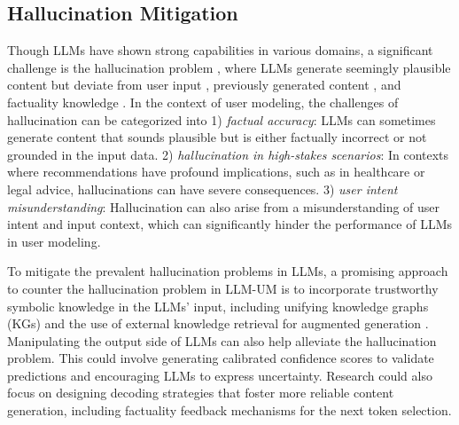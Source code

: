 \documentclass[11pt]{article}
\begin{document}
\subsection{Hallucination Mitigation}
Though LLMs have shown strong capabilities in various domains, a significant challenge is the hallucination problem \cite{zhang2023siren, ji2023survey}, where LLMs generate seemingly plausible content but deviate from user input \cite{adlakha2023evaluating}, previously generated content \cite{liu2021token}, and factuality knowledge \cite{min2023factscore, feng2023factkb}. In the context of user modeling, the challenges of hallucination can be categorized into 1) \textit{factual accuracy}: LLMs can sometimes generate content that sounds plausible but is either factually incorrect or not grounded in the input data. 2) \textit{hallucination in high-stakes scenarios}: In contexts where recommendations have profound implications, such as in healthcare or legal advice, hallucinations can have severe consequences. 3) \textit{user intent misunderstanding}: Hallucination can also arise from a misunderstanding of user intent and input context, which can significantly hinder the performance of LLMs in user modeling.



To mitigate the prevalent hallucination problems in LLMs, a promising approach to counter the hallucination problem in LLM-UM is to incorporate trustworthy symbolic knowledge in the LLMs' input, including unifying knowledge graphs (KGs) \cite{pan2023unifying} and the use of external knowledge retrieval for augmented generation \cite{yu2022survey}. Manipulating the output side of LLMs can also help alleviate the hallucination problem. This could involve generating calibrated confidence scores to validate predictions and encouraging LLMs to express uncertainty. Research could also focus on designing decoding strategies that foster more reliable content generation, including factuality feedback mechanisms for the next token selection.
\end{document}
